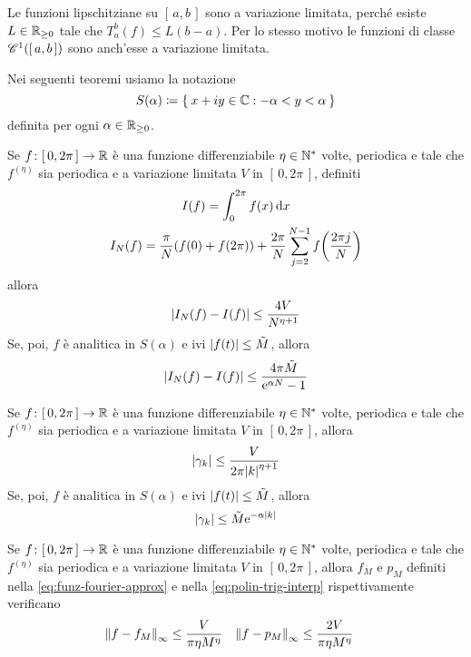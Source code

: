 	\begin{esempio}
		Le funzioni lipschitziane su \([\, a, b \,]\) sono a variazione limitata, perché esiste \(L \in \mathbb{R}_{\ge 0}\) tale che \(T_a^b (f) \le L (b - a)\). Per lo stesso motivo le funzioni di classe \(\mathscr{C}^1 ([\, a, b \,])\) sono anch'esse a variazione limitata.
	\end{esempio}
	
	Nei seguenti teoremi usiamo la notazione
	\begin{equation}
		S (\alpha) \coloneqq \Set{x + i y \in \mathbb{C}: -\alpha < y < \alpha}
	\end{equation}
	definita per ogni \(\alpha \in \mathbb{R}_{\ge 0}\).
	
	\begin{teorema}
		Se \(f \colon [\, 0, 2 \pi \,] \to \mathbb{R}\) è una funzione differenziabile \(\eta \in \mathbb{N}^*\) volte, periodica e tale che \(f^{(\eta)}\) sia periodica e a variazione limitata \(V\) in \([\, 0, 2 \pi \,]\), definiti
		\begin{gather*}
			I (f) = \int_0^{2 \pi} f (x) \dd{x} \\
			I_N (f) = \frac{\pi}{N} (f (0) + f (2 \pi)) + \frac{2 \pi}{N} \sum_{j = 2}^{N - 1} f \qty(\frac{2 \pi j}{N})
		\end{gather*}
		allora
		\begin{equation}
			\abs{I_N (f) - I (f)} \le \frac{4 V}{N^{\eta + 1}}
		\end{equation}
		Se, poi, \(f\) è analitica in \(S (\alpha)\) e ivi \(\abs{f (t)} \le \tilde{M}\), allora
		\begin{equation}
			\abs{I_N (f) - I (f)} \le \frac{4 \pi \tilde{M}}{\mathrm{e}^{\alpha N} - 1}
		\end{equation}
	\end{teorema}

	\begin{teorema}
		Se \(f \colon [\, 0, 2 \pi \,] \to \mathbb{R}\) è una funzione differenziabile \(\eta \in \mathbb{N}^*\) volte, periodica e tale che \(f^{(\eta)}\) sia periodica e a variazione limitata \(V\) in \([\, 0, 2 \pi \,]\), allora
		\begin{equation}
			\abs{\gamma_k} \le \frac{V}{2 \pi \abs{k}^{\eta + 1}}
		\end{equation}
		Se, poi, \(f\) è analitica in \(S (\alpha)\) e ivi \(\abs{f (t)} \le \tilde{M}\), allora
		\begin{equation}
			\abs{\gamma_k} \le \tilde{M} \mathrm{e}^{- \alpha \abs{k}}
		\end{equation}
	\end{teorema}

	\begin{teorema}
		Se \(f \colon [\, 0, 2 \pi \,] \to \mathbb{R}\) è una funzione differenziabile \(\eta \in \mathbb{N}^*\) volte, periodica e tale che \(f^{(\eta)}\) sia periodica e a variazione limitata \(V\) in \([\, 0, 2 \pi \,]\), allora \(f_M\) e \(p_M\) definiti nella \eqref{eq:funz-fourier-approx} e nella \eqref{eq:polin-trig-interp} rispettivamente verificano
		\begin{align}
			\norm{f - f_M}_\infty &\le \frac{V}{\pi \eta M^\eta} &
			\norm{f - p_M}_\infty &\le \frac{2 V}{\pi \eta M^\eta}
		\end{align}
	\end{teorema}
